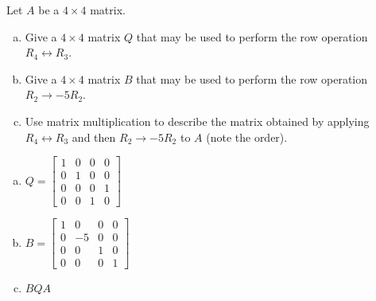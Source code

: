 
\begin{exerciseStatement}


Let \(A\) be a \(4 \times 4\) matrix.


\begin{enumerate}[(a)]
\item Give a \(4 \times 4\) matrix \(Q\) that may be used to perform the row operation \( R_4 \leftrightarrow R_3 \).
\item Give a \(4 \times 4\) matrix \(B\) that may be used to perform the row operation \( R_2 \to -5R_2 \).
\item Use matrix multiplication to describe the matrix obtained by applying \( R_4 \leftrightarrow R_3 \) and then \( R_2 \to -5R_2 \) to \(A\) (note the order). 
\end{enumerate}
    
\end{exerciseStatement}
    
\begin{exerciseAnswer} 

\begin{enumerate}[(a)]
\item \(Q= \left[\begin{array}{cccc}
1 & 0 & 0 & 0 \\
0 & 1 & 0 & 0 \\
0 & 0 & 0 & 1 \\
0 & 0 & 1 & 0
\end{array}\right] \)
\item \(B= \left[\begin{array}{cccc}
1 & 0 & 0 & 0 \\
0 & -5 & 0 & 0 \\
0 & 0 & 1 & 0 \\
0 & 0 & 0 & 1
\end{array}\right] \)
\item \(BQA\)
\end{enumerate}
    
\end{exerciseAnswer}
    
